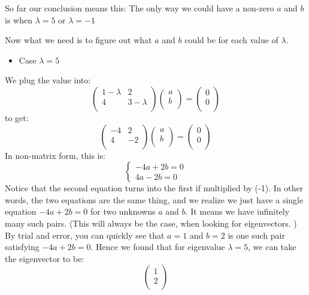 \documentclass[12pt]{report}
\begin{document}
So far our conclusion means this: The only way we could have a non-zero $a$ and $b$ is when $\lambda = 5$ or $\lambda =-1$

Now what we need is to figure out what $a$ and $b$ could be for each value of $\lambda$.

\begin{itemize}
\item  Case $\lambda = 5 $
\end{itemize}
We plug the value into:
$$\begin{pmatrix} 1- \lambda &2 \\ 4& 3- \lambda\\ \end{pmatrix} \begin{pmatrix} a \\ b\\ \end{pmatrix} =  \begin{pmatrix} 0 \\ 0\\ \end{pmatrix} $$
to get:
$$\begin{pmatrix} -4 & 2 \\ 4& -2 \\ \end{pmatrix} \begin{pmatrix} a \\ b\\ \end{pmatrix} =  \begin{pmatrix} 0 \\ 0\\ \end{pmatrix} $$
In non-matrix form, this is:
$$\begin{cases} -4a+2b =0  \\ 4a -2b= 0 \end{cases}$$
Notice that the second equation turns into the first if multiplied by (-1). In other words, the two equations are the same thing, and we realize we just have a single equation $-4a+2b =0$ for two unknowns $a$ and $b$. It means we have infinitely many such pairs. (This will always be the case, when looking for eigenvectors. ) By trial and error, you can quickly see that $a=1$ and $b=2$ is one such pair satisfying $-4a+2b =0$. Hence we found that for eigenvalue $\lambda = 5 $, we can take the eigenvector to be:
$$\begin{pmatrix} 1 \\ 2 \\ \end{pmatrix} $$
\end{document}
